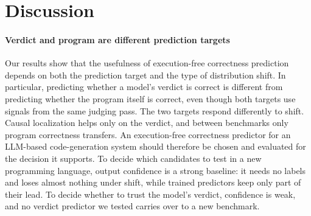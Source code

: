 \section{Discussion}
\label{sec:discussion}

\paragraph{Verdict and program are different prediction targets}
Our results show that the usefulness of execution-free correctness prediction depends on both the prediction target and the type of distribution shift. In particular, predicting whether a model's verdict is correct is different from predicting whether the program itself is correct, even though both targets use signals from the same judging pass.
The two targets respond differently to shift. Causal localization helps only on the verdict, and between benchmarks only program correctness transfers. An execution-free correctness predictor for an LLM-based code-generation system should therefore be chosen and evaluated for the decision it supports. To decide which candidates to test in a new programming language, output confidence is a strong baseline: it needs no labels and loses almost nothing under shift,
while trained predictors keep only part of their lead. To decide whether to
trust the model's verdict, confidence is weak, and no verdict predictor we tested
carries over to a new benchmark. %


